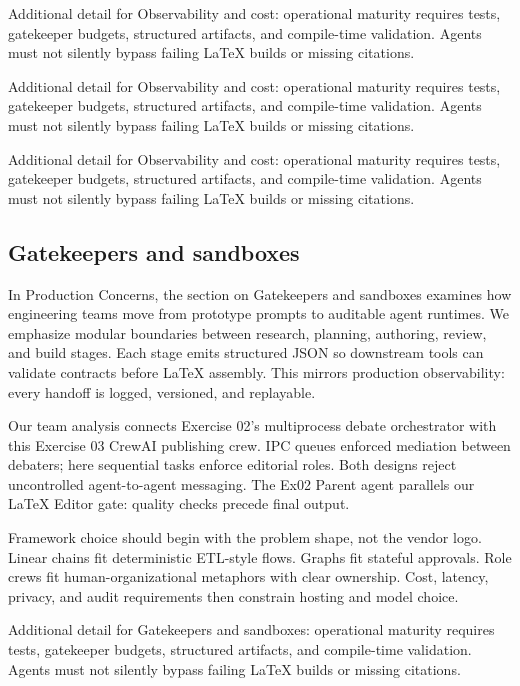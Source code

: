 Additional detail for Observability and cost: operational maturity requires tests, gatekeeper budgets, structured artifacts, and compile-time validation. Agents must not silently bypass failing LaTeX builds or missing citations. \cite{crewai2024} \cite{langgraph2024} \cite{mcp2024}

Additional detail for Observability and cost: operational maturity requires tests, gatekeeper budgets, structured artifacts, and compile-time validation. Agents must not silently bypass failing LaTeX builds or missing citations. \cite{crewai2024} \cite{langgraph2024} \cite{mcp2024}

Additional detail for Observability and cost: operational maturity requires tests, gatekeeper budgets, structured artifacts, and compile-time validation. Agents must not silently bypass failing LaTeX builds or missing citations. \cite{crewai2024} \cite{langgraph2024} \cite{mcp2024}

\subsection{Gatekeepers and sandboxes}
In Production Concerns, the section on Gatekeepers and sandboxes examines how engineering teams move from prototype prompts to auditable agent runtimes. We emphasize modular boundaries between research, planning, authoring, review, and build stages. Each stage emits structured JSON so downstream tools can validate contracts before LaTeX assembly. This mirrors production observability: every handoff is logged, versioned, and replayable. \cite{crewai2024} \cite{langgraph2024} \cite{mcp2024}

Our team analysis connects Exercise 02's multiprocess debate orchestrator with this Exercise 03 CrewAI publishing crew. IPC queues enforced mediation between debaters; here sequential tasks enforce editorial roles. Both designs reject uncontrolled agent-to-agent messaging. The Ex02 Parent agent parallels our LaTeX Editor gate: quality checks precede final output. \cite{crewai2024} \cite{langgraph2024} \cite{mcp2024}

Framework choice should begin with the problem shape, not the vendor logo. Linear chains fit deterministic ETL-style flows. Graphs fit stateful approvals. Role crews fit human-organizational metaphors with clear ownership. Cost, latency, privacy, and audit requirements then constrain hosting and model choice. \cite{crewai2024} \cite{langgraph2024} \cite{mcp2024}

Additional detail for Gatekeepers and sandboxes: operational maturity requires tests, gatekeeper budgets, structured artifacts, and compile-time validation. Agents must not silently bypass failing LaTeX builds or missing citations. \cite{crewai2024} \cite{langgraph2024} \cite{mcp2024}

